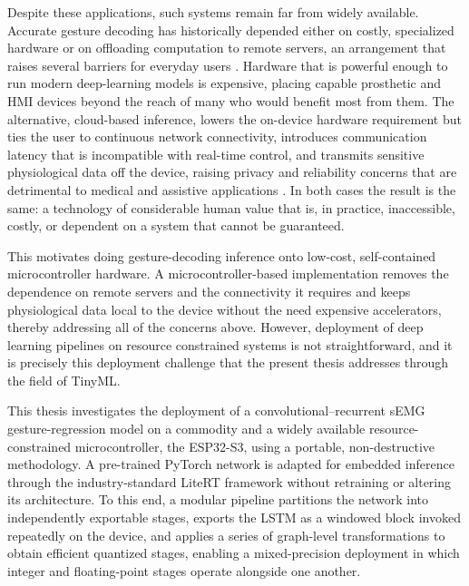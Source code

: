 \documentclass[12pt,DIV16,BCOR12mm,a4paper,footinclude=false,headinclude,parskip=half-,twoside,openright,cleardoublepage=empty,toc=index,bibliography=totoc,listof=totoc]{scrreprt}
\numberwithin{equation}{chapter}
\begin{document}
    Despite these applications, such systems remain far from widely available. Accurate
    gesture decoding has historically depended either on costly, specialized
    hardware or on offloading computation to remote servers, an arrangement that
    raises several barriers for everyday users \cite{salmingerCurrentRatesProsthetic2022}. Hardware that is powerful enough to
    run modern deep-learning models is expensive, placing capable prosthetic
    and HMI devices beyond the reach of many who would benefit most from them. The
    alternative, cloud-based inference, lowers the on-device hardware requirement but
    ties the user to continuous network connectivity, introduces communication
    latency that is incompatible with real-time control, and transmits sensitive
    physiological data off the device, raising privacy and reliability concerns that
    are detrimental to medical and assistive applications \cite{linTinyMachineLearning2024,yelchuriReviewTinyML2022}.
    In both cases the result is the same: a technology of considerable human value that is, in
    practice, inaccessible, costly, or dependent on a system that cannot be
    guaranteed.
    
    This motivates doing gesture-decoding inference onto
    low-cost, self-contained microcontroller hardware. A microcontroller-based
    implementation removes the dependence on remote servers and the connectivity it
    requires and keeps physiological data local to the device without the need
    expensive accelerators, thereby addressing all of the concerns above. However, deployment
    of deep learning pipelines on resource constrained systems is not
    straightforward, and it is precisely this deployment challenge that the
    present thesis addresses through the field of TinyML.

    This thesis investigates the deployment of a convolutional--recurrent sEMG
    gesture-regression model on a commodity and a widely available resource-constrained microcontroller, 
    the ESP32-S3, using a portable, non-destructive methodology. A pre-trained PyTorch
    network is adapted for embedded inference through the industry-standard LiteRT
    framework without retraining or altering its architecture. To this end, a modular
    pipeline partitions the network into independently exportable stages, exports the
    LSTM as a windowed block invoked repeatedly on the device, and applies a series of
    graph-level transformations to obtain efficient quantized stages, enabling a
    mixed-precision deployment in which integer and floating-point stages operate
    alongside one another.
\end{document}
